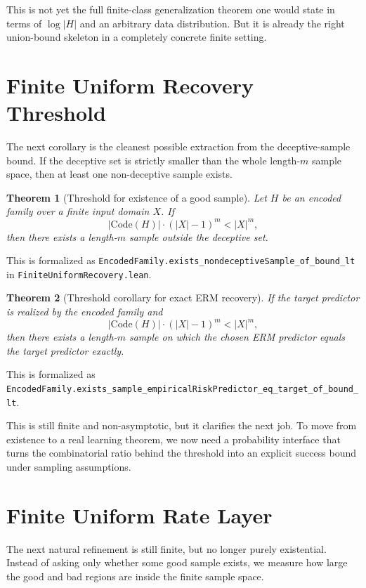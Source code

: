 \documentclass[11pt]{article}
\newtheorem{theorem}{Theorem}[section]
\theoremstyle{remark}
\begin{document}
This is not yet the full finite-class generalization theorem one would state in
terms of \(\log |H|\) and an arbitrary data distribution.  But it is already the
right union-bound skeleton in a completely concrete finite setting.

\section{Finite Uniform Recovery Threshold}

The next corollary is the cleanest possible extraction from the deceptive-sample
bound.  If the deceptive set is strictly smaller than the whole length-\(m\)
sample space, then at least one non-deceptive sample exists.

\begin{theorem}[Threshold for existence of a good sample]
Let \(H\) be an encoded family over a finite input domain \(X\).  If
\[
  |\mathrm{Code}(H)| \cdot (|X|-1)^m < |X|^m,
\]
then there exists a length-\(m\) sample outside the deceptive set.
\end{theorem}

\noindent
This is formalized as
\texttt{EncodedFamily.exists\_nondeceptiveSample\_of\_bound\_lt} in
\texttt{FiniteUniformRecovery.lean}.

\begin{theorem}[Threshold corollary for exact ERM recovery]
If the target predictor is realized by the encoded family and
\[
  |\mathrm{Code}(H)| \cdot (|X|-1)^m < |X|^m,
\]
then there exists a length-\(m\) sample on which the chosen ERM predictor equals
the target predictor exactly.
\end{theorem}

\noindent
This is formalized as
\texttt{EncodedFamily.exists\_sample\_empiricalRiskPredictor\_eq\_target\_of\_bound\_lt}.

This is still finite and non-asymptotic, but it clarifies the next job.  To move
from existence to a real learning theorem, we now need a probability interface
that turns the combinatorial ratio behind the threshold into an explicit success
bound under sampling assumptions.

\section{Finite Uniform Rate Layer}

The next natural refinement is still finite, but no longer purely existential.
Instead of asking only whether some good sample exists, we measure how large the
good and bad regions are inside the finite sample space.
\end{document}
